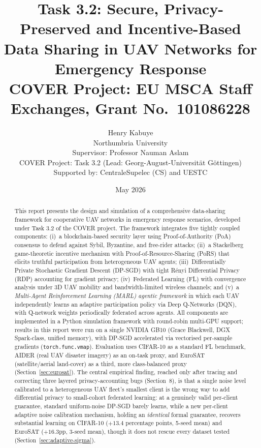 \documentclass[12pt,a4paper]{article}
\title{\textbf{Task 3.2: Secure, Privacy-Preserved and Incentive-Based\\
Data Sharing in UAV Networks for Emergency Response}\\[6pt]
\large COVER Project: EU MSCA Staff Exchanges, Grant No.\ 101086228}
\author{Henry Kabuye\\
\small Northumbria University\\
\small Supervisor: Professor Nauman Aslam\\
\small COVER Project: Task 3.2 (Lead: Georg-August-Universit\"at G\"ottingen)\\
\small Supported by: CentraleSupelec (CS) and UESTC}
\date{May 2026}
\begin{document}
\maketitle
\begin{abstract}
This report presents the design and simulation of a comprehensive data-sharing
framework for cooperative UAV networks in emergency response scenarios, developed
under Task 3.2 of the COVER project.  The framework integrates five tightly coupled
components: (i)~a blockchain-based security layer using Proof-of-Authority (PoA)
consensus to defend against Sybil, Byzantine, and free-rider attacks;
(ii)~a Stackelberg game-theoretic incentive mechanism with Proof-of-Resource-Sharing
(PoRS) that elicits truthful participation from heterogeneous UAV agents;
(iii)~Differentially Private Stochastic Gradient Descent (DP-SGD) with tight Rényi
Differential Privacy (RDP) accounting for gradient privacy;
(iv)~Federated Learning (FL) with convergence analysis under 3D UAV mobility and
bandwidth-limited wireless channels; and (v)~a \emph{Multi-Agent Reinforcement
Learning (MARL) agentic framework} in which each UAV independently learns an
adaptive participation policy via Deep Q-Networks (DQN), with Q-network weights
periodically federated across agents.  All components are implemented in a Python
simulation framework with round-robin multi-GPU support; results in this report
were run on a single NVIDIA GB10 (Grace Blackwell, DGX Spark-class, unified
memory), with DP-SGD accelerated via vectorised per-sample gradients
(\texttt{torch.func.vmap}).  Evaluation uses CIFAR-10 as a standard FL benchmark,
AIDER (real UAV disaster imagery) as an on-task proxy, and EuroSAT
(satellite/aerial land-cover) as a third, more class-balanced proxy
(Section~\ref{sec:eurosat}). The central empirical finding, reached only
after tracing and correcting three layered privacy-accounting bugs
(Section~8), is that a single noise level calibrated to a heterogeneous
UAV fleet's smallest client is the wrong way to add differential privacy
to small-cohort federated learning: at a genuinely valid per-client
guarantee, standard uniform-noise DP-SGD barely learns, while a new
per-client adaptive noise calibration mechanism, holding an
\emph{identical} formal guarantee, recovers substantial learning on
CIFAR-10 ($+13.4$ percentage points, 5-seed mean) and EuroSAT ($+16.3$pp,
3-seed mean), though it does not rescue every dataset tested
(Section~\ref{sec:adaptive-sigma}).
\end{abstract}

\tableofcontents
\newpage
\end{document}
